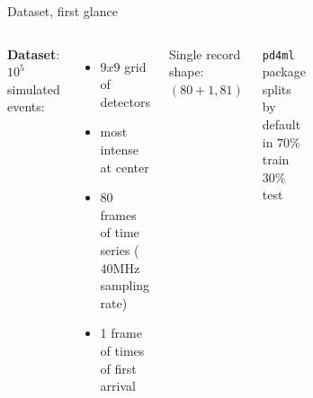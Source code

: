 \documentclass{beamer}
\begin{document}
\begin{frame}{Dataset, first glance}

    \begin{columns}
    
    \textbf{Dataset}: $10^5$ simulated events:
    \vspace{5 pt}

    \begin{itemize}
        \item[\textbullet] $9 x 9$ grid of detectors
        \item[\textbullet] most intense at center 
        \item[\textbullet] 80 frames of time series ($40$MHz sampling rate)
        \item[\textbullet] 1 frame of times of first arrival 
    \end{itemize}
    \vspace{10 pt}

    Single record shape: $(80 + 1 , 81)$\\
    \vspace{15 pt}

    \texttt{pd4ml} package splits by default in $70\%$ train $30\%$ test
    
    
        \begin{figure}
            \centering
            \includegraphics[width=0.45\textwidth]{figures/times_of_arrival.pdf}
        \end{figure}
        
         \begin{figure}
            \centering
            \includegraphics[width=0.65\textwidth]{figures/time_series.pdf}
        \end{figure}
    

\end{columns}
\end{frame}
\end{document}
